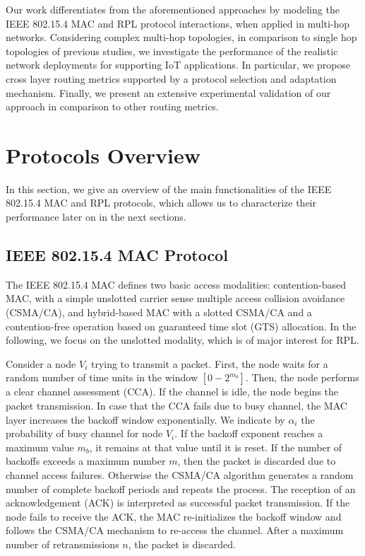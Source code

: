 \documentclass[review, 1p, 11pt]{elsarticle}
\numberwithin{equation}{section}
\begin{document}
Our work differentiates from the aforementioned approaches by modeling the IEEE 802.15.4 MAC and RPL protocol interactions, when applied in multi-hop networks.  Considering complex multi-hop topologies, in comparison to single hop topologies of previous studies, we investigate the performance of the realistic network deployments for supporting IoT applications. In particular, we propose cross layer routing metrics supported by a protocol selection and adaptation mechanism. Finally, we present an extensive experimental validation of our approach in comparison to other routing metrics.


\section{Protocols Overview}\label{sec:over-uns}

In this section, we give an overview of the main functionalities of the IEEE 802.15.4 MAC and RPL protocols, which allows us to characterize their performance later on in the next sections.

\subsection{IEEE 802.15.4 MAC Protocol}\label{sec:mac}

The  IEEE 802.15.4 MAC defines two basic access
modalities: contention-based MAC, with a simple unslotted
carrier sense multiple access collision avoidance (CSMA/CA), and
hybrid-based MAC with a slotted CSMA/CA
and a contention-free operation based on guaranteed time slot (GTS) allocation.
In the following, we focus on the unslotted modality, which is of major interest for RPL.

Consider a node $V_i$ trying to transmit a packet.
First, the node waits for a random number of time units in the window $[0 - 2^{m_0}]$. Then, the
node performs a clear channel assessment (CCA). If the channel is
idle, the node begins the packet transmission. In case that the CCA
fails due to busy channel, the MAC layer increases the backoff window exponentially.
We indicate by $\alpha_i$ the probability of busy channel for node $V_i$. If the backoff exponent
reaches a maximum value $m_b$, it remains at that value until it is reset. If the number of backoffs exceeds
a maximum number $m$, then the packet is discarded due to channel access failures.
Otherwise the CSMA/CA algorithm
generates a random number of complete backoff periods and repeats
the process.
The reception of an acknowledgement (ACK) is interpreted as successful packet
transmission. If the node fails to receive the ACK, the MAC re-initializes
the backoff window and follows the CSMA/CA mechanism to re-access
the channel. After a maximum number of retransmissions $n$, the packet is discarded.
\end{document}
